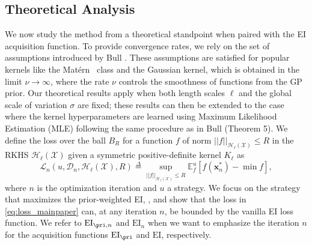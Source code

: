 \subsection{Theoretical Analysis} \label{sec:theory}
We now study the \method method from a theoretical standpoint when paired with the EI acquisition function. 
To provide convergence rates, we rely on the set of assumptions introduced by Bull \citep{JMLR:v12:bull11a}. 
These assumptions are satisfied for popular kernels like the Matérn~\citep{matern1960spatial} class and the Gaussian kernel, which is obtained in the limit $\nu \rightarrow \infty$, 
where the rate $\nu$ controls the smoothness of functions from the GP prior.
Our theoretical results apply when both length scales ${\bm{\ell}}$ and the global scale of variation $\sigma$ are fixed; these results can then be extended to the case where the kernel hyperparameters are learned using Maximum Likelihood Estimation (MLE) following the same procedure as in Bull \citep{JMLR:v12:bull11a} (Theorem 5).
We define the loss over the ball $B_R$ for a function $f$ of norm $||f||_{\mathcal{H}_{\bm{\ell}}(\mathcal{X})} \leq R$ in the RKHS $\mathcal{H}_{\bm{\ell}}(\mathcal{X})$ given a symmetric positive-definite kernel $K_{\bm{\ell}}$ as
\begin{equation} \label{eq:loss_mainpaper}
    \mathcal{L}_{n}(u, \mathcal{D}_n, \mathcal{H}_{\bm{\ell}}(\mathcal{X}), R) \overset{\Delta}{=} \sup_{{||f||}_{\mathcal{H}_{\bm{\ell}}(\mathcal{X})}\leq R}\mathbb{E}^u_f[f(\bm{x}^*_n) - \min f],
\end{equation}
where $n$ is the optimization iteration and $u$ a strategy. We focus on the strategy that maximizes the prior-weighted EI, \pei{}, and show that the loss in \eqref{eq:loss_mainpaper} 
can, at any iteration $n$, be bounded by the vanilla EI loss function. 
We refer to $\text{EI}_{\pri, n}$ and $\text{EI}_{n}$ when we want to emphasize the iteration $n$ for the acquisition functions $\text{EI}_{\pri}$ and $\text{EI}$, respectively. 

